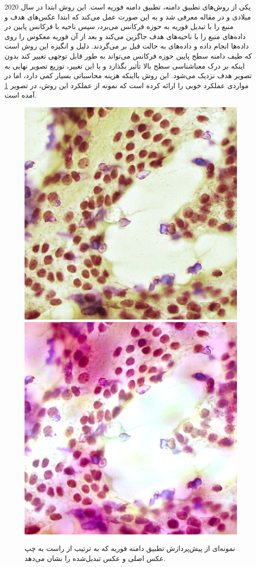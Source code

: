 یکی از روش‌های تطبیق دامنه، تطبیق دامنه فوریه است. این روش ابتدا در سال 2020 میلادی و در مقاله \cite{yang2020fda} معرفی شد و به این صورت عمل می‌کند که ابتدا عکس‌های هدف و منبع را با تبدیل فوریه به حوزه فرکانس می‌برد، سپس ناحیه با فرکانس پایین در داده‌های منبع را با ناحیه‌های هدف جاگزین می‌کند و بعد از آن فوریه معکوس را روی داده‌ها انجام داده و داده‌های به حالت قبل بر می‌گردند. دلیل و انگیزه این روش است که طیف دامنه سطح پایین حوزه فرکانس می‌تواند به طور قابل توجهی تغییر کند بدون اینکه بر درک معناشناسی سطح بالا تأثیر بگذارد و با این تغییر، توزیع تصویر نهایی به تصویر هدف نزدیک می‌شود.
این روش بااینکه هزینه محاسباتی بسیار کمی دارد، اما در مواردی عملکرد خوبی را ارائه کرده است که نمونه از عملکرد این روش، در تصویر \ref{fda augmentation} آمده است.
\begin{figure}
    \begin{center}
        \includegraphics[width=0.48\linewidth]{figs/suggested_methods/subs/data_augmentation/fda_1054-original.jpeg}
        \includegraphics[width=0.48\linewidth]{figs/suggested_methods/subs/data_augmentation/fda_1054-transformed.jpeg}
    \end{center}
    \caption{نمونه‌ای از پیش‌پردازش تطبیق دامنه فوریه که به ترتیب از راست به چپ عکس اصلی و عکس تبدیل‌شده را نشان می‌دهد.}
    \label{fda augmentation}
\end{figure}

